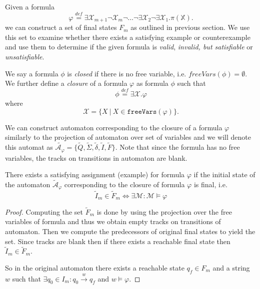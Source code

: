 Given a formula
\begin{equation*}
 \varphi \overset{\mathit{def}}{=}
 \exists\mathcal{X}_{m+1}\neg\mathcal{X}_m\neg\ldots\neg\exists\mathcal{X}_2\neg\exists\mathcal{X}_1
 .
 \pi(\mathbb{X}).
\end{equation*}
we can construct a set of final states $F_m$ as outlined in previous section.
We use this set to examine whether there exists a satisfying example or
counterexample and use them to determine if the given formula is \emph{valid},
\emph{invalid, but satisfiable} or \emph{unsatisfiable}.

\begin{defz}
We say a formula $\phi$ is \emph{closed} if there is no free variable, i.e.
$freeVars(\phi) = \emptyset$.
We further define a \emph{closure} of a formula $\varphi$ as formula $\phi$ such that
\begin{equation}
 \phi \overset{\mathit{def}}{=} \exists\mathcal{X}. \varphi
\end{equation}
where
\begin{equation}
 \mathcal{X} = \{X\ |\ X \in \mathtt{freeVars}(\varphi)\}.
\end{equation}

We can construct automaton corresponding to the closure of a formula $\varphi$
similarly to the projection of automaton over set of variables and we will
denote this automat as $\widetilde{\mathcal{A_\varphi}} = \{\widetilde{Q},
\widetilde{\Sigma}, \widetilde{\delta}, \widetilde{I}, \widetilde{F}\}$. Note that since the
formula has no free variables, the tracks on transitions in automaton are blank.
\end{defz}

\begin{lemma}\label{exists-example}
There exists a satisfying assignment (example) for formula $\varphi$ if the
initial state of the automaton $\widetilde{\mathcal{A}}_\varphi$ corresponding
to the closure of formula $\varphi$ is final, i.e.
\begin{equation}
 \widetilde{I}_m \in \widetilde{F}_m \Leftrightarrow \exists \mathcal{M}:
 \mathcal{M} \models \varphi
\end{equation}
\end{lemma}

\begin{proof}
 Computing the set $\widetilde{F}_m$ is done by using the projection over the
 free variables of formula and thus we obtain empty tracks on transitions of
 automaton. Then we compute the predecessors of original final states to yield
 the set. Since tracks are blank then if there exists a reachable final state
 then $\widetilde{I}_m \in \widetilde{F}_m$. 
 
 So in the original automaton there exists a reachable state $q_f \in F_m$ and a
 string $w$ such that $\exists q_0 \in I_m: q_0 \overset{w}{\longrightarrow}
 q_f$ and $w \models \varphi$.
\end{proof}

